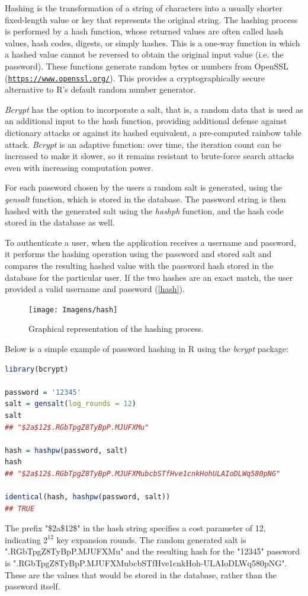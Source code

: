 Hashing is the transformation of a string of characters into a usually shorter fixed-length value or key that represents the original string. The hashing process is performed by a hash function, whose returned values are often called hash values, hash codes, digests, or simply hashes. This is a one-way function in which a hashed value cannot be reversed to obtain the original input value (i.e. the password). These functions generate random bytes or numbers from OpenSSL (\href{https://www.openssl.org/}{\nolinkurl{https://www.openssl.org/}}). This provides a cryptographically secure alternative to R's default random number generator. 

\textit{Bcrypt} has the option to incorporate a salt, that is, a random data that is used as an additional input to the hash function, providing additional defense against dictionary attacks or against its hashed equivalent, a pre-computed rainbow table attack. \textit{Bcrypt} is an adaptive function: over time, the iteration count can be increased to make it slower, so it remains resistant to brute-force search attacks even with increasing computation power.

For each password chosen by the users a random salt is generated, using the \textit{gensalt} function, which is stored in the database. The password string is then hashed with the generated salt using the \textit{hashph} function, and the hash code stored in the database as well. 

To authenticate a user, when the application receives a username and password, it performs the hashing operation using the password and stored salt and compares the resulting hashed value with the password hash stored in the database for the particular user. If the two hashes are an exact match, the user provided a valid username and password (\autoref{hash}).

\begin{figure}[h]
	\centering
	\texttt{[image: Imagens/hash]}
	\caption{Graphical representation of the hashing process.}
	\label{hash}
\end{figure}


Below is a simple example of password hashing in R using the \textit{bcrypt} package:


\begin{lstlisting}[language = R]
library(bcrypt)

password = '12345'
salt = gensalt(log_rounds = 12)
salt
## "$2a$12$.RGbTpgZ8TyBpP.MJUFXMu"

hash = hashpw(password, salt)
hash
## "$2a$12$.RGbTpgZ8TyBpP.MJUFXMubcbSTfHve1cnkHohULAIoDLWq580pNG"

identical(hash, hashpw(password, salt))
## TRUE

\end{lstlisting}

The prefix "\$2a\$12\$" in the hash string specifies a cost parameter of 12, indicating $2^{12}$ key expansion rounds. The random generated salt is ".RGbTpgZ8TyBpP.MJUFXMu" and the resulting hash for the "12345" password is ".RGbTpgZ8TyBpP.MJUFXMubcbSTfHve1cnkHoh-ULAIoDLWq580pNG". These are the values that would be stored in the database, rather than the password itself.

